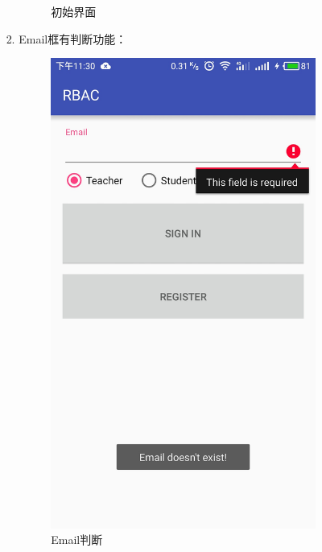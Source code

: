 \begin{itemize}
\begin{enumerate}
\begin{itemize}
\begin{enumerate}
\begin{figure}[H]
					\caption{初始界面}
					\label{fig:1}
				\end{figure}
				
				\item Email框有判断功能：
				\begin{figure}[H]
					\centering
					\includegraphics[height=0.39\textheight]{snapshot/2}
					\caption{Email判断}
					\label{fig:2}
				\end{figure}
				

\end{enumerate}
\end{itemize}
\end{enumerate}
\end{itemize}
